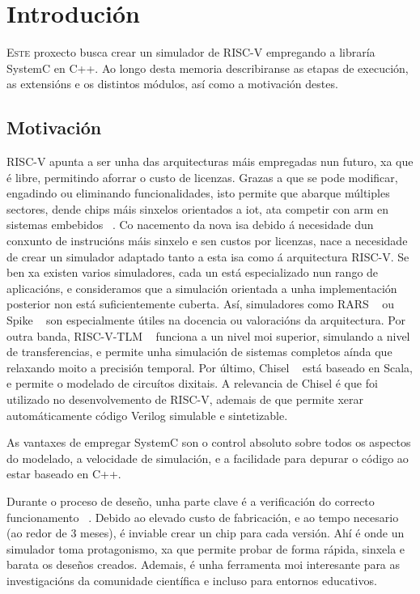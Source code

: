 \chapter{Introdución}
\label{chap:introducion}

\lettrine{E}{ste} proxecto busca crear un simulador de RISC-V empregando a libraría SystemC en C++. Ao longo desta memoria describiranse as etapas de execución, as extensións e os distintos módulos, así como a motivación destes.

\section{Motivación}
\label{sec:motivación}
RISC-V apunta a ser unha das arquitecturas máis empregadas nun futuro, xa que é libre, permitindo aforrar o custo de licenzas. Grazas a que se pode modificar, engadindo ou eliminando funcionalidades, isto permite que abarque múltiples sectores, dende \gls{chips} máis sinxelos orientados a \acrfull{iot}, ata competir con \acrshort{arm} en sistemas embebidos ~\cite{RISCV_IoT,RISCV_vsARM}. Co nacemento da nova \acrfull{isa} debido á necesidade dun conxunto de instrucións máis sinxelo e sen custos por licenzas, nace a necesidade de crear un simulador adaptado tanto a esta \acrshort{isa} como á arquitectura RISC-V. Se ben xa existen varios simuladores, cada un está especializado nun rango de aplicacións, e consideramos que a simulación orientada a unha implementación posterior non está suficientemente cuberta. Así, simuladores como RARS ~\cite{rars} ou Spike ~\cite{sim_spike} son especialmente útiles na docencia ou valoracións da arquitectura. Por outra banda, RISC-V-TLM ~\cite{riscv_tlm} funciona a un nivel moi superior, simulando a nivel de transferencias, e permite unha simulación de sistemas completos aínda que relaxando moito a precisión temporal. Por último, Chisel ~\cite{chisel} está baseado en Scala, e permite o modelado de circuítos dixitais. A relevancia de Chisel é que foi utilizado no desenvolvemento de RISC-V, ademais de que permite xerar automáticamente código Verilog simulable e sintetizable.

As vantaxes de empregar SystemC son o control absoluto sobre todos os aspectos do modelado, a velocidade de simulación, e a facilidade para depurar o código ao estar baseado en C++.

Durante o proceso de deseño, unha parte clave é a verificación do correcto funcionamento ~\cite{ChipVerify_verification,RISCV_verification}. Debido ao elevado custo de fabricación, e ao tempo necesario (ao redor de 3 meses), é inviable crear un chip para cada versión. Ahí é onde un simulador toma protagonismo, xa que permite probar de forma rápida, sinxela e barata os deseños creados. Ademais, é unha ferramenta moi interesante para as investigacións da comunidade científica e incluso para entornos educativos.

